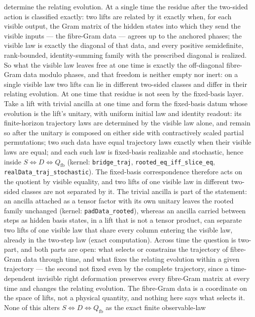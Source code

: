 \documentclass[
]{article}
\begin{document}
determine the relating evolution. At a single time the residue after the
two-sided action is classified exactly: two lifts are related by it
exactly when, for each visible output, the Gram matrix of the hidden
states into which they send the visible inputs --- the fibre-Gram data
--- agrees up to the anchored phases; the visible law is exactly the
diagonal of that data, and every positive semidefinite, rank-bounded,
identity-summing family with the prescribed diagonal is realized. So
what the visible law leaves free at one time is exactly the off-diagonal
fibre-Gram data modulo phases, and that freedom is neither empty nor
inert: on a single visible law two lifts can lie in different two-sided
classes and differ in their relating evolution. At one time that residue
is not seen by the fixed-basis layer. Take a lift with trivial ancilla
at one time and form the fixed-basis datum whose evolution is the lift's
unitary, with uniform initial law and identity readout: its
finite-horizon trajectory laws are determined by the visible law alone,
and remain so after the unitary is composed on either side with
contractively scaled partial permutations; two such data have equal
trajectory laws exactly when their visible laws are equal; and each such
law is fixed-basis realizable and stochastic, hence inside
\(S \iff D \iff Q_{\mathrm{fb}}\) (kernel: \texttt{bridge\_traj},
\texttt{rooted\_eq\_iff\_slice\_eq},
\texttt{realData\_traj\_stochastic}). The fixed-basis correspondence
therefore acts on the quotient by visible equality, and two lifts of one
visible law in different two-sided classes are not separated by it. The
trivial ancilla is part of the statement: an ancilla attached as a
tensor factor with its own unitary leaves the rooted family unchanged
(kernel: \texttt{padData\_rooted}), whereas an ancilla carried between
steps as hidden basis states, in a lift that is not a tensor product,
can separate two lifts of one visible law that share every column
entering the visible law, already in the two-step law (exact
computation). Across time the question is two-part, and both parts are
open: what selects or constrains the trajectory of fibre-Gram data
through time, and what fixes the relating evolution within a given
trajectory --- the second not fixed even by the complete trajectory,
since a time-dependent invisible right deformation preserves every
fibre-Gram matrix at every time and changes the relating evolution. The
fibre-Gram data is a coordinate on the space of lifts, not a physical
quantity, and nothing here says what selects it. None of this alters
\(S \iff D \iff Q_{\mathrm{fb}}\) as the exact finite observable-law
\end{document}
